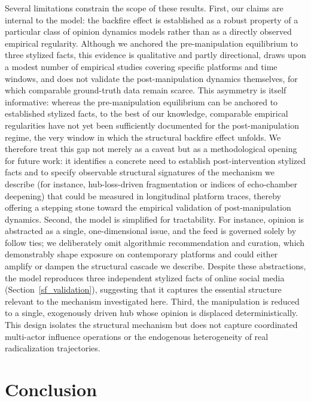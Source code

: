 \documentclass[pdflatex,sn-mathphys-num]{sn-jnl}%
\theoremstyle{thmstyleone}%
\theoremstyle{thmstyletwo}%
\theoremstyle{thmstylethree}%
\begin{document}
Several limitations constrain the scope of these results. First, our claims are
internal to the model: the backfire effect is established as a robust property of
a particular class of opinion dynamics models rather than as a directly observed
empirical regularity. Although we anchored the pre-manipulation equilibrium to
three stylized facts, this evidence is qualitative and partly directional,
draws upon a modest number of empirical studies
covering specific platforms and time windows, and does not validate the
post-manipulation dynamics themselves, for which comparable ground-truth data
remain scarce. This asymmetry is itself informative: whereas the pre-manipulation
equilibrium can be anchored to established stylized facts, to the best of our knowledge,
comparable empirical regularities have not yet been sufficiently documented for the post-manipulation regime, the very
window in which the structural backfire effect unfolds. We therefore treat this gap
not merely as a caveat but as a methodological opening for future work: it
identifies a concrete need to establish post-intervention stylized facts and to
specify observable structural signatures of the mechanism we describe (for instance,
hub-loss-driven fragmentation or indices of echo-chamber deepening) that could be
measured in longitudinal platform traces, thereby offering a stepping stone toward
the empirical validation of post-manipulation dynamics. 
Second, the model is simplified for tractability. 
For instance, opinion is abstracted as a single, one-dimensional 
issue, and the feed is governed solely by follow ties; 
we deliberately omit algorithmic recommendation and curation, 
which demonstrably shape exposure on contemporary platforms and 
could either amplify or dampen the structural cascade we 
describe. Despite these abstractions, the model 
reproduces three independent stylized facts of online social 
media (Section~\ref{sf_validation}), suggesting that it captures 
the essential structure relevant to the mechanism investigated 
here.
Third, the manipulation is reduced to a single, exogenously driven hub whose
opinion is displaced deterministically. This design isolates the structural
mechanism but does not capture coordinated multi-actor influence operations or the
endogenous heterogeneity of real radicalization trajectories.
\par


\section{Conclusion}
\end{document}
